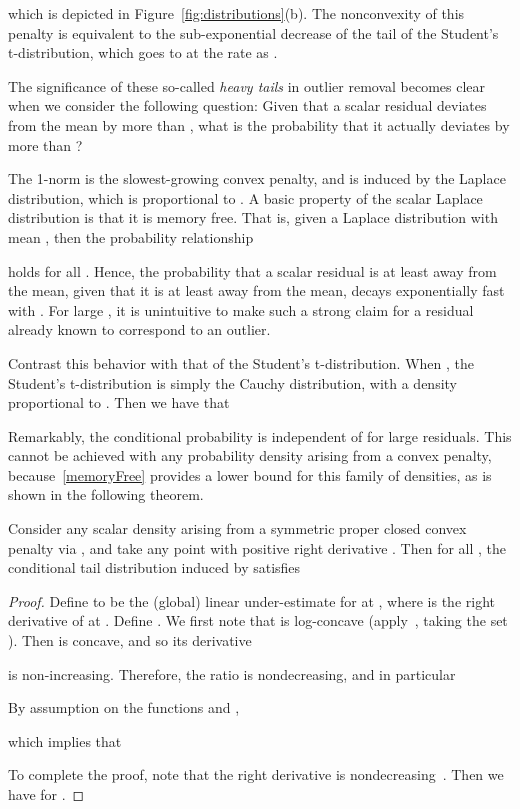 \documentclass[nospthms]{svjour3}
\numberwithin{equation}{section}
\begin{document}
which is depicted in Figure~\ref{fig:distributions}(b).
The nonconvexity of this penalty is equivalent to the sub-exponential
decrease of the tail of the Student's t-distribution, which goes to 
at the rate  as .

The significance of these so-called \emph{heavy tails} in outlier
removal becomes clear when we consider the following question:
Given that a scalar residual deviates from the mean by more than ,
what is the probability that it actually deviates by more than ?

The 1-norm is the slowest-growing convex penalty, and is induced by
the Laplace distribution, which is proportional to
.  A basic property of the scalar Laplace
distribution is that it is memory free. That is, given a Laplace
distribution with mean , then the probability relationship

holds for all . Hence, the probability that a scalar
residual is at least  away from the mean, given that it is at
least  away from the mean, decays exponentially fast with .
For large , it is unintuitive to make such a strong claim for a
residual already known to correspond to an outlier.

Contrast this behavior with that of the Student's t-distribution.
When , the Student's t-distribution is simply the Cauchy
distribution, with a density proportional to .  Then we
have that

Remarkably, the conditional probability is independent of  for
large residuals. This cannot be achieved with any probability density
arising from a convex penalty, because~\eqref{memoryFree} provides a
lower bound for this family of densities, as is shown in the following
theorem.





\begin{btheorem}
\label{UniversalLowerBound}
Consider any scalar density  arising from a symmetric proper closed convex
penalty  via , and take any point  with positive right derivative
 .
Then for all , the conditional tail
distribution induced by  satisfies

\end{btheorem}
\begin{proof}
  Define  to be the (global)
  linear under-estimate for  at , where
   is the right derivative of  at
  . Define . We first note
  that  is log-concave (apply~\cite[Theorem 3]{Prekopa1971},
  taking the set ).  Then  is
  concave, and so its derivative
  
  is non-increasing. Therefore, the ratio  is nondecreasing,
   and in particular
  
  By assumption on the functions  and ,
  
  which implies that
  
To complete the proof, note that the right derivative
 is nondecreasing~\cite[Theorem 24.1]{RTR}. Then we
have  for .
\end{proof}
\end{document}
